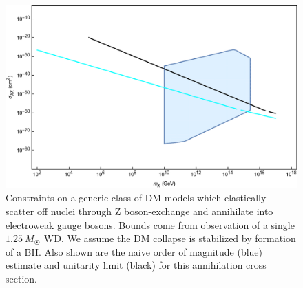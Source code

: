 \documentclass[preprintnumbers,amsmath,amssymb,prd,superscriptaddress]{revtex4}
\begin{document}
\begin{figure}
\includegraphics[scale=.35]{GZcapture.pdf}
\caption{Constraints on a generic class of DM models which elastically scatter off nuclei through Z boson-exchange and annihilate into electroweak gauge bosons. Bounds come from observation of a single $1.25~M_{\astrosun}$ WD.
We assume the DM collapse is stabilized by formation of a BH. Also shown are the naive order of magnitude (blue) estimate and unitarity limit (black) for this annihilation cross section.}
\label{fig:multicapture}
\end{figure}
\end{document}
